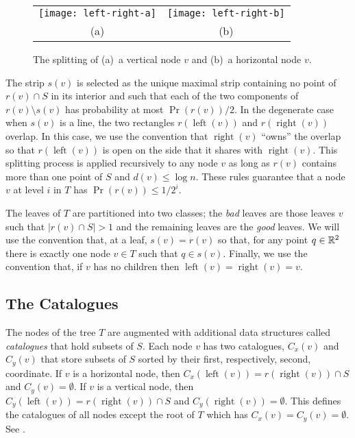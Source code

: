\documentclass[lotsofwhite,charterfonts]{patmorin}
\DeclareMathOperator{\lft}{left}
\DeclareMathOperator{\rght}{right}
\newcommand{\depth}{d}
\begin{document}
\begin{figure}
  \begin{center}
    \begin{tabular}{cc}
      \texttt{[image: left-right-a]} & \texttt{[image: left-right-b]} \\
      (a) & (b)
    \end{tabular}
  \end{center}
  \caption{The splitting of (a)~a vertical node $v$ and (b)~a horizontal
  node $v$.}
\end{figure}

The strip $s(v)$ is selected as the unique maximal strip containing no
point of $r(v)\cap S$ in its interior and such that each of the two
components of $r(v)\setminus s(v)$ has probability at most
$\Pr(r(v))/2$.  In the degenerate case when $s(v)$ is a line, the two
rectangles $r(\lft(v))$ and $r(\rght(v))$ overlap.  In this case, we
use the convention that $\rght(v)$ ``owns'' the overlap so that
$r(\lft(v))$ is open on the side that it shares with $\rght(v)$.  This
splitting process is applied recursively to any node $v$ as long as
$r(v)$ contains more than one point of $S$ and $\depth(v)\le \log n$.
These rules guarantee that a node $v$ at level $i$ in $T$ has
$\Pr(r(v))\le 1/2^i$.

The leaves of $T$ are partitioned into two classes; the \emph{bad}
leaves are those leaves $v$ such that $|r(v)\cap S| > 1$ and the
remaining leaves are the \emph{good} leaves.  We will use the
convention that, at a leaf, $s(v)=r(v)$ so that, for any point
$q\in\mathbb{R}^2$ there is exactly one node $v\in T$ such that $q\in s(v)$.
Finally, we use the convention that, if $v$ has no children then
$\lft(v)=\rght(v)= v$.

\subsection{The Catalogues}

The nodes of the tree $T$ are augmented with additional data
structures called \emph{catalogues} that hold subsets of $S$.  Each
node $v$ has two catalogues, $C_x(v)$ and $C_y(v)$ that store subsets
of $S$ sorted by their first, respectively, second, coordinate. 
If $v$ is a horizontal node, then $C_x(\lft(v))=
r(\rght(v))\cap S$ and $C_y(v)=\emptyset$.  If $v$ is a
vertical node, then $C_y(\lft(v)) = r(\rght(v))\cap S$ and
$C_y(\rght(v))=\emptyset$.  This defines the catalogues of all nodes
except the root of $T$ which has $C_x(v)=C_y(v)=\emptyset$. See
.
\end{document}
